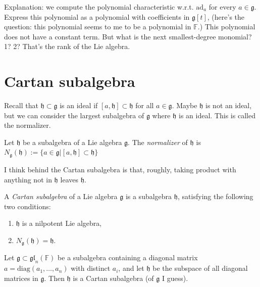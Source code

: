 Explanation: we compute the polynomial
characteristic w.r.t.
$\text{ad}_a$ for every $a \in \mathfrak{g}$.
Express this polynomial as a polynomial with
coefficients in $\mathfrak{g}[t]$,
(here's the question: this polynomial seems
to me to be a polynomial
in $\mathbb{F}$.)
This polynomial does not have a constant
term.
But what is the next smallest-degree
monomial? 1? 2?
That's the rank of the Lie algebra.

\section{Cartan subalgebra}
\label{section-Cartan-subalgebra}

Recall that $\mathfrak{h}\subset\mathfrak{g}$
is an ideal
if $[a,\mathfrak{h}]\subset\mathfrak{h}$ for
all $a \in \mathfrak{g}$.
Maybe $\mathfrak{h}$ is not an ideal, but we
can consider the largest subalgebra of
$\mathfrak{g}$
where $\mathfrak{h}$ is an ideal.
This is called the normalizer.

\begin{definition}
\label{definition-normalizer}
Let $\mathfrak{h}$ be a subalgebra of a Lie
algebra $\mathfrak{g}$.
The {\it normalizer} of $\mathfrak{h}$
is
$N_\mathfrak{g}(\mathfrak{h}):=\{a \in
\mathfrak{g}
|[a,\mathfrak{h}]\subset\mathfrak{h}\}$
\end{definition}

I think behind the Cartan subalgebra is that,
roughly,
taking product with
anything not in $\mathfrak{h}$ leaves
$\mathfrak{h}$.

\begin{definition}
\label{definition-Cartan-subalgebra}
A {\it Cartan subalgebra} of a Lie algebra
$\mathfrak{g}$ is a subalgebra
$\mathfrak{h}$, satisfying the following two
conditions:
\begin{enumerate}
\item $\mathfrak{h}$ is a nilpotent Lie
algebra,
\item
$N_\mathfrak{g}(\mathfrak{h})=\mathfrak{h}$.
\end{enumerate}
\end{definition}

\begin{proposition}
\label{proposition-diago-matri-carta-subal}
Let $\mathfrak{g}\subset
\mathfrak{gl}_n(\mathbb{F})$ be a subalgebra
containing a diagonal matrix
$a=\text{diag}(a_1,\ldots,a_n)$
with distinct $a_i$, and let $\mathfrak{h}$
be the subspace
of all diagonal matrices in $\mathfrak{g}$.
Then $\mathfrak{h}$
is a Cartan subalgebra (of $\mathfrak{g}$ I
guess).
\end{proposition}

